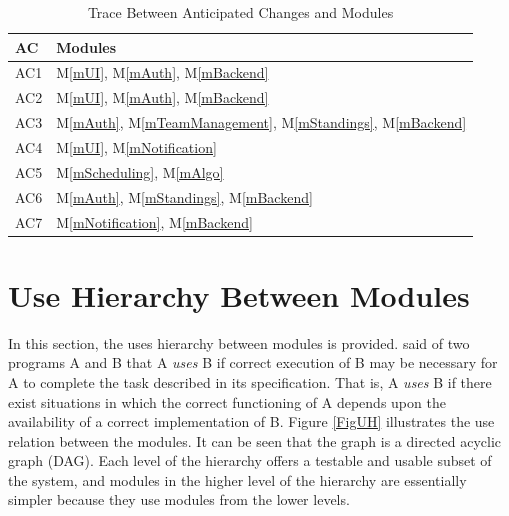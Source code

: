 \documentclass[12pt, titlepage]{article}
\newcommand{\acref}[1]{AC\ref{#1}}
\newcommand{\mref}[1]{M\ref{#1}}
\begin{document}
\begin{table}[H]
\centering
\begin{tabular}{p{} p{}}
\toprule
\textbf{AC} & \textbf{Modules}\\
\midrule
AC1 & \mref{mUI}, \mref{mAuth}, \mref{mBackend}\\
AC2 & \mref{mUI}, \mref{mAuth}, \mref{mBackend}\\
AC3 & \mref{mAuth}, \mref{mTeamManagement}, \mref{mStandings}, \mref{mBackend}\\
AC4 & \mref{mUI}, \mref{mNotification}\\
AC5 & \mref{mScheduling}, \mref{mAlgo}\\
AC6 & \mref{mAuth}, \mref{mStandings}, \mref{mBackend}\\
AC7 & \mref{mNotification}, \mref{mBackend}\\
\bottomrule
\end{tabular}
\caption{Trace Between Anticipated Changes and Modules}
\label{TblACT}
\end{table}

\section{Use Hierarchy Between Modules} \label{SecUse}

In this section, the uses hierarchy between modules is
provided. \citet{Parnas1978} said of two programs A and B that A {\em uses} B if
correct execution of B may be necessary for A to complete the task described in
its specification. That is, A {\em uses} B if there exist situations in which
the correct functioning of A depends upon the availability of a correct
implementation of B.  Figure \ref{FigUH} illustrates the use relation between
the modules. It can be seen that the graph is a directed acyclic graph
(DAG). Each level of the hierarchy offers a testable and usable subset of the
system, and modules in the higher level of the hierarchy are essentially simpler
because they use modules from the lower levels.
\end{document}
